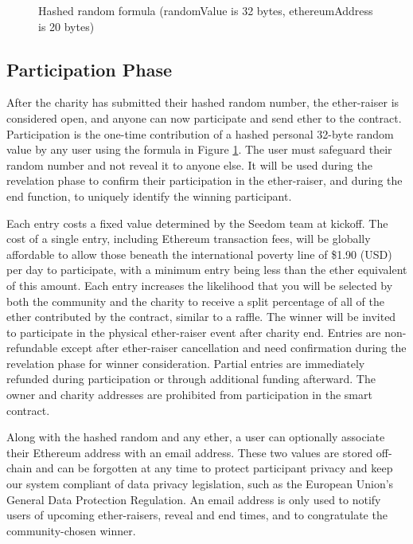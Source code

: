 \documentclass[11pt]{article}
\begin{document}
\begin{figure}[H]
\begin{center}
\caption{Hashed random formula (randomValue is 32 bytes, ethereumAddress is 20 bytes)}
\label{figure:hashedRandomFormula}
\end{center}
\end{figure}

\subsection{Participation Phase}

After the charity has submitted their hashed random number, the ether-raiser is considered open, and anyone can now participate and send ether to the contract. Participation is the one-time contribution of a hashed personal 32-byte random value by any user using the formula in Figure \ref{figure:hashedRandomFormula}. The user must safeguard their random number and not reveal it to anyone else. It will be used during the revelation phase to confirm their participation in the ether-raiser, and during the end function, to uniquely identify the winning participant.

Each entry costs a fixed value determined by the Seedom team at kickoff. The cost of a single entry, including Ethereum transaction fees, will be globally affordable to allow those beneath the international poverty line of \$1.90 (USD) per day \cite{1} to participate, with a minimum entry being less than the ether equivalent of this amount. Each entry increases the likelihood that you will be selected by both the community and the charity to receive a split percentage of all of the ether contributed by the contract, similar to a raffle. The winner will be invited to participate in the physical ether-raiser event after charity end. Entries are non-refundable except after ether-raiser cancellation and need confirmation during the revelation phase for winner consideration. Partial entries are immediately refunded during participation or through additional funding afterward. The owner and charity addresses are prohibited from participation in the smart contract.

Along with the hashed random and any ether, a user can optionally associate their Ethereum address with an email address. These two values are stored off-chain and can be forgotten at any time to protect participant privacy and keep our system compliant of data privacy legislation, such as the European Union's General Data Protection Regulation. An email address is only used to notify users of upcoming ether-raisers, reveal and end times, and to congratulate the community-chosen winner.
\end{document}
